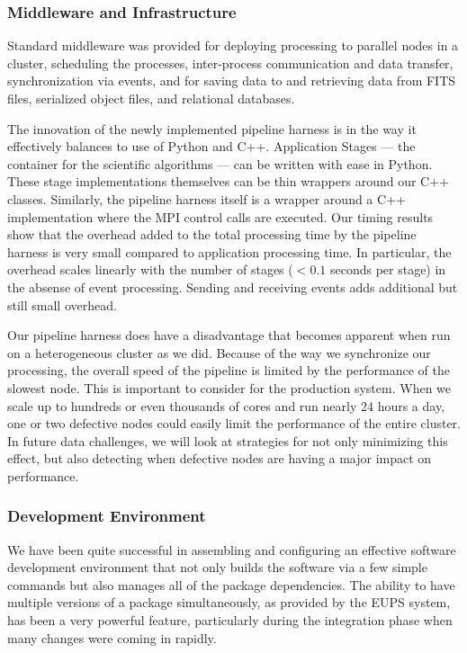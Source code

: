 \subsubsection*{Middleware and Infrastructure}

Standard middleware was provided for deploying processing to parallel nodes in a cluster, scheduling the processes, inter-process communication and data transfer, synchronization via events, and for saving data to and retrieving data from FITS files, serialized object files, and relational databases.

The innovation of the newly implemented pipeline harness is in the way it effectively balances to use of Python and C++.  Application Stages --- the container for the scientific algorithms --- can be written with ease in Python.  These stage implementations themselves can be thin wrappers around our C++ classes.  Similarly, the pipeline harness itself is a wrapper around a C++ implementation where the MPI control calls are executed.  Our timing results show that the overhead added to the total processing time by the pipeline harness is very small compared to application processing time.  In particular, the overhead scales linearly with the number of stages ($< 0.1$ seconds per stage) in the absense of event processing.  Sending and receiving events adds additional but still small overhead.  

Our pipeline harness does have a disadvantage that becomes apparent when run on a heterogeneous cluster as we did.  Because of the way we synchronize our processing, the overall speed of the pipeline is limited by the performance of the slowest node.  This is important to consider for the production system.  When we scale up to hundreds or even thousands of cores and run nearly 24 hours a day, one or two defective nodes could easily limit the performance of the entire cluster.  In future data challenges, we will look at strategies for not only minimizing this effect, but also detecting when defective nodes are having a major impact on performance.

\subsubsection*{Development Environment}

We have been quite successful in assembling and configuring an effective software development environment that not only builds the software via a few simple commands but also manages all of the package dependencies.  The ability to have multiple versions of a package simultaneously, as provided by the EUPS system, has been a very powerful feature, particularly during the integration phase when many changes were coming in rapidly.  

